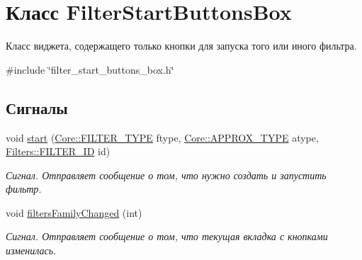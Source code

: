 \hypertarget{class_filter_start_buttons_box}{}\section{Класс Filter\+Start\+Buttons\+Box}
\label{class_filter_start_buttons_box}


Класс виджета, содержащего только кнопки для запуска того или иного фильтра.  




{\ttfamily \#include \char`\"{}filter\+\_\+start\+\_\+buttons\+\_\+box.\+h\char`\"{}}

\subsection*{Сигналы}
\begin{DoxyCompactItemize}
\item 
void \hyperlink{class_filter_start_buttons_box_ac6e2a6555f1d388391f188f834b8e753}{start} (\hyperlink{namespace_core_af88278693f3c866f217da796f4bb9af7}{Core\+::\+F\+I\+L\+T\+E\+R\+\_\+\+T\+Y\+PE} ftype, \hyperlink{namespace_core_acd67f53ff1d9b21fabb1da4474a8f7d9}{Core\+::\+A\+P\+P\+R\+O\+X\+\_\+\+T\+Y\+PE} atype, \hyperlink{namespace_filters_a1b615faac44ef992d0af44da40ff26d7}{Filters\+::\+F\+I\+L\+T\+E\+R\+\_\+\+ID} id)
\begin{DoxyCompactList}\small\item\em Сигнал. Отправляет сообщение о том, что нужно создать и запустить фильтр. \end{DoxyCompactList}\item 
void \hyperlink{class_filter_start_buttons_box_accdef9f92d8edb5b87ba0e7fbd36a8d8}{filters\+Family\+Changed} (int)
\begin{DoxyCompactList}\small\item\em Сигнал. Отправляет сообщение о том, что текущая вкладка с кнопками изменилась. \end{DoxyCompactList}\end{DoxyCompactItemize}
